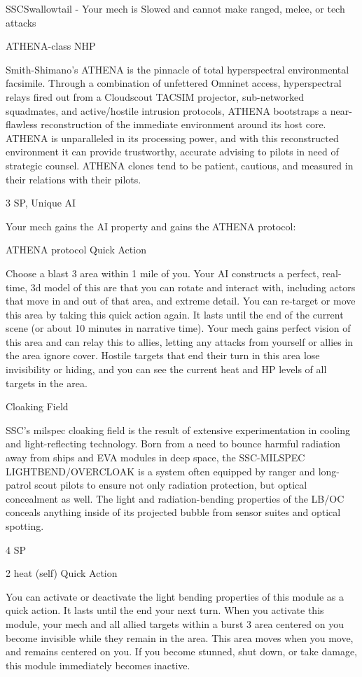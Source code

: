 \begin{mech}{SSC}{Swallowtail}
     -   Your mech is Slowed and cannot make ranged, melee, or tech attacks


ATHENA-class NHP

Smith-Shimano's ATHENA is the pinnacle of total hyperspectral environmental facsimile. Through a combination of unfettered Omninet access, hyperspectral relays fired out from a Cloudscout TACSIM projector, sub-networked squadmates, and active/hostile intrusion protocols, ATHENA bootstraps a near- flawless reconstruction of the immediate environment around its host core. ATHENA is unparalleled in its processing power, and with this reconstructed environment it can provide trustworthy, accurate advising to pilots in need of strategic counsel. ATHENA clones tend to be patient, cautious, and measured in their relations with their pilots.

3 SP, Unique
AI

Your mech gains the AI property and gains the ATHENA protocol:

ATHENA protocol
Quick Action

Choose a blast 3 area within 1 mile of you. Your AI constructs a perfect, real-time, 3d model of this are that you can rotate and interact with, including actors that move in and out of that area, and extreme detail. You can re-target or move this area by taking this quick action again. It lasts until the end of the current scene (or about 10 minutes in narrative time). Your mech gains perfect vision of this area and can relay this to allies, letting any attacks from yourself or allies in the area ignore cover. Hostile targets that end their turn in this area lose invisibility or hiding, and you can see the current heat and HP levels of all targets in the area.


Cloaking Field

SSC's milspec cloaking field is the result of extensive experimentation in cooling and light-reflecting technology. Born from a need to bounce harmful radiation away from ships and EVA modules in deep space, the SSC-MILSPEC LIGHTBEND/OVERCLOAK is a system often equipped by ranger and long-patrol scout pilots to ensure not only radiation protection, but optical concealment as well. The light and radiation-bending properties of the LB/OC conceals anything inside of its projected bubble from sensor suites and optical spotting.

4 SP

2 heat (self)
Quick Action

You can activate or deactivate the light bending properties of this module as a quick action. It lasts until the end your next turn. When you activate this module, your mech and all allied targets within a burst 3 area centered on you become invisible while they remain in the area. This area moves when you move, and remains centered on you. If you become stunned, shut down, or take damage, this module immediately becomes inactive.
\end{mech}